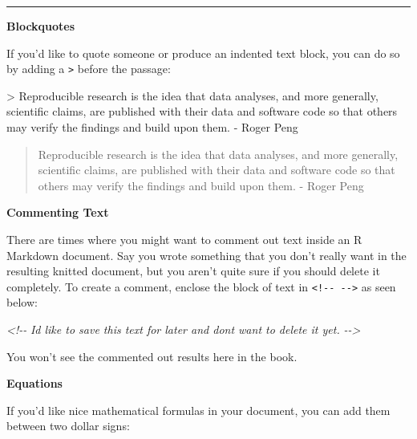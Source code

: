 \documentclass[]{tufte-book}
\newenvironment{Shaded}{\begin{snugshade}}{\end{snugshade}}
\newcommand{\AttributeTok}[1]{\textcolor[rgb]{0.13,0.29,0.53}{#1}}
\newcommand{\CommentTok}[1]{\textcolor[rgb]{0.56,0.35,0.01}{\textit{#1}}}
\begin{document}
\begin{center}\rule{0.5\linewidth}{0.5pt}\end{center}

\textbf{Blockquotes}

If you'd like to quote someone or produce an indented text block, you can do so by adding a \texttt{\textgreater{}} before the passage:

\begin{Shaded}
\begin{Highlighting}[]
\AttributeTok{\textgreater{} Reproducible research is the idea that data analyses, and more generally,}
\AttributeTok{scientific claims, are published with their data and software code so that}
\AttributeTok{others may verify the findings and build upon them. {-} Roger Peng}
\end{Highlighting}
\end{Shaded}

\begin{quote}
Reproducible research is the idea that data analyses, and more generally, scientific claims, are published with their data and software code so that others may verify the findings and build upon them. - Roger Peng
\end{quote}

\textbf{Commenting Text}

There are times where you might want to comment out text inside an R Markdown document. Say you wrote something that you don't really want in the resulting knitted document, but you aren't quite sure if you should delete it completely. To create a comment, enclose the block of text in \texttt{\textless{}!-\/-\ -\/-\textgreater{}} as seen below:

\begin{Shaded}
\begin{Highlighting}[]
\CommentTok{\textless{}!{-}{-}}
\CommentTok{I\textquotesingle{}d like to save this text for later and don\textquotesingle{}t want to delete it yet.}
\CommentTok{{-}{-}\textgreater{}}
\end{Highlighting}
\end{Shaded}

You won't see the commented out results here in the book.

\vspace*{0.2in}

\noindent\textbf{Equations}\vspace*{0.1in}

If you'd like nice mathematical formulas in your document, you can add them between two dollar signs:
\end{document}
